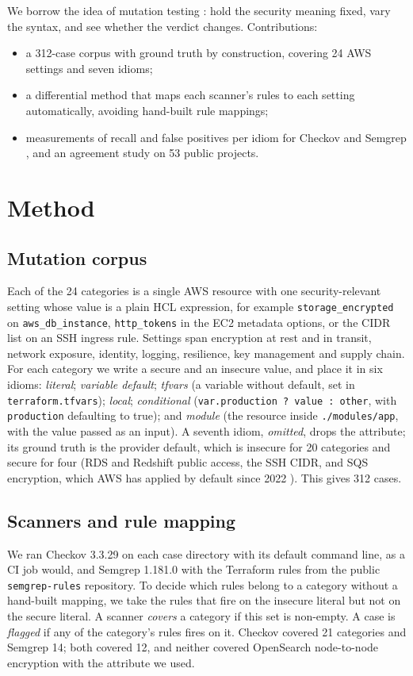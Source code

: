 \documentclass[11pt]{article}
\begin{document}
We borrow the idea of mutation testing \cite{jia2011mutation}: hold the security meaning fixed, vary the syntax, and see whether the
verdict changes. Contributions:
\begin{itemize}
  \item a 312-case corpus with ground truth by construction, covering 24 AWS settings and seven idioms;
  \item a differential method that maps each scanner's rules to each setting automatically, avoiding hand-built rule mappings;
  \item measurements of recall and false positives per idiom for Checkov \cite{checkov} and Semgrep \cite{semgrep}, and an
        agreement study on 53 public projects.
\end{itemize}

\section{Method}
\subsection{Mutation corpus}
Each of the 24 categories is a single AWS resource with one security-relevant setting whose value is a plain HCL expression, for
example \texttt{storage\_encrypted} on \texttt{aws\_db\_instance}, \texttt{http\_tokens} in the EC2 metadata options, or the CIDR list on
an SSH ingress rule. Settings span encryption at rest and in transit, network exposure, identity, logging, resilience, key management
and supply chain. For each category we write a secure and an insecure value, and place it in six idioms:
\emph{literal}; \emph{variable default}; \emph{tfvars} (a variable without default, set in \texttt{terraform.tfvars});
\emph{local}; \emph{conditional} (\texttt{var.production ? value : other}, with \texttt{production} defaulting to true); and
\emph{module} (the resource inside \texttt{./modules/app}, with the value passed as an input). A seventh idiom, \emph{omitted}, drops the
attribute; its ground truth is the provider default, which is insecure for 20 categories and secure for four (RDS and Redshift public
access, the SSH CIDR, and SQS encryption, which AWS has applied by default since 2022 \cite{awssqssse}). This gives 312 cases.

\subsection{Scanners and rule mapping}
We ran Checkov 3.3.29 on each case directory with its default command line, as a CI job would, and Semgrep 1.181.0 with the Terraform
rules from the public \texttt{semgrep-rules} repository. To decide which rules belong to a category without a hand-built mapping, we
take the rules that fire on the insecure literal but not on the secure literal. A scanner \emph{covers} a category if this set is
non-empty. A case is \emph{flagged} if any of the category's rules fires on it. Checkov covered 21 categories and Semgrep 14; both
covered 12, and neither covered OpenSearch node-to-node encryption with the attribute we used.
\end{document}
